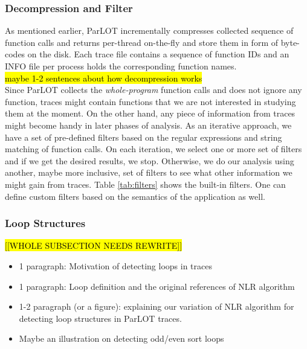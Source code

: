 \subsubsection{Decompression and Filter} 
As mentioned earlier, ParLOT incrementally compresses collected sequence of function calls and returns per-thread on-the-fly and store them in form of byte-codes on the disk. Each trace file contains a sequence of function IDs and an INFO file per process holds the corresponding function names.
%
\\
\hl{maybe 1-2 sentences about how decompression works}
\\
Since ParLOT collects the \textit{whole-program} function calls and does not ignore any function, traces might contain functions that we are not interested in studying them at the moment.
%
On the other hand, any piece of information from traces might become handy in later phases of analysis.
%
As an iterative approach, we have a set of pre-defined filters based on the regular expressions and string matching of function calls.
%
On each iteration, we select one or more set of filters and if we get the desired results, we stop. Otherwise, we do our analysis using another, maybe more inclusive, set of filters to see what other information we might gain from traces.
%
Table \ref{tab:filters} shows the built-in filters. One can define custom filters based on the semantics of the application as well.
%




\subsubsection{Loop Structures} 
\hl{[[WHOLE SUBSECTION NEEDS REWRITE]]}

\begin{itemize}
	\item 1 paragraph: Motivation of detecting loops in traces
	\item 1 paragraph: Loop definition and the original references of NLR algorithm
	\item 1-2 paragraph (or a figure): explaining our variation of NLR algorithm for detecting loop structures in ParLOT traces.
	\item Maybe an illustration on detecting odd/even sort loops
\end{itemize}

